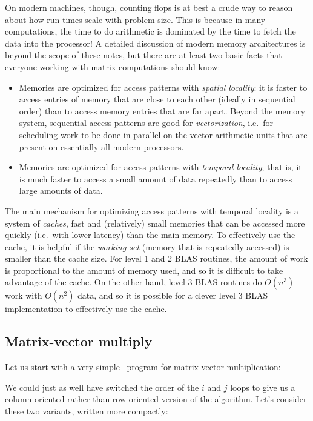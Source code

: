 \documentclass[12pt, leqno]{article} %
\begin{document}
On modern machines, though, counting flops is at best a crude way
to reason about how run times scale with problem size.  This is because
in many computations, the time to do arithmetic is dominated by the time
to fetch the data into the processor!  A detailed discussion of modern
memory architectures is beyond the scope of these notes, but there are
at least two basic facts that everyone working with matrix computations
should know:
\begin{itemize}
\item
  Memories are optimized for access patterns with {\em spatial locality}:
  it is faster to access entries of memory that are close to each
  other (ideally in sequential order) than to access memory entries that
  are far apart.  Beyond the memory system, sequential access patterns
  are good for {\em vectorization}, i.e.~for scheduling work to be done
  in parallel on the vector arithmetic units
  that are present on essentially all modern processors.
\item
  Memories are optimized for access patterns with {\em temporal locality};
  that is, it is much faster to access a small amount of data repeatedly
  than to access large amounts of data.
\end{itemize}

The main mechanism for optimizing access patterns with temporal locality
is a system of {\em caches}, fast and (relatively) small memories that can
be accessed more quickly (i.e.~with lower latency) than the main memory.
To effectively use the cache, it is helpful if the {\em working set}
(memory that is repeatedly accessed) is smaller than the cache size.
For level 1 and 2 BLAS routines, the amount of work is proportional to
the amount of memory used, and so it is difficult to take advantage of
the cache.  On the other hand, level 3 BLAS routines do $O(n^3)$ work
with $O(n^2)$ data, and so it is possible for a clever level 3 BLAS
implementation to effectively use the cache.

\subsection{Matrix-vector multiply}

Let us start with a very simple \matlab\ program for matrix-vector
multiplication:

We could just as well have switched the order of the $i$ and $j$ loops
to give us a column-oriented rather than row-oriented version of the algorithm.
Let's consider these two variants, written more compactly:


\end{document}
